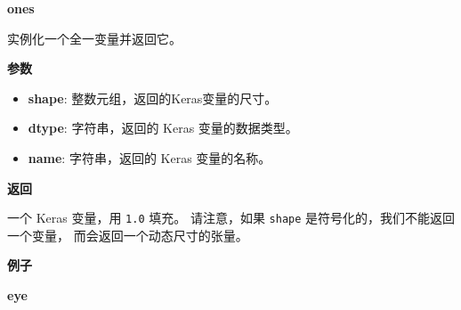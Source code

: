 \textbf{ones}\label{ones}

\begin{Shaded}
\begin{Highlighting}[]
\OperatorTok{=}\OperatorTok{=}\NormalTok{)}
\end{Highlighting}
\end{Shaded}

实例化一个全一变量并返回它。

\textbf{参数}

\begin{itemize}
\tightlist
\item
  \textbf{shape}: 整数元组，返回的Keras变量的尺寸。
\item
  \textbf{dtype}: 字符串，返回的 Keras 变量的数据类型。
\item
  \textbf{name}: 字符串，返回的 Keras 变量的名称。
\end{itemize}

\textbf{返回}

一个 Keras 变量，用 \texttt{1.0} 填充。 请注意，如果 \texttt{shape}
是符号化的，我们不能返回一个变量， 而会返回一个动态尺寸的张量。

\textbf{例子}

\begin{Shaded}
\begin{Highlighting}[]
\OperatorTok{>>>}    
\OperatorTok{>>>} \OperatorTok{=} \NormalTok{,}\NormalTok{))}
\OperatorTok{>>>} 
\NormalTok{array([[ }\NormalTok{.],}
       \NormalTok{[ }\NormalTok{.],}
       \NormalTok{[ }\NormalTok{.]], dtype}\OperatorTok{=}
\end{Highlighting}
\end{Shaded}


\textbf{eye}\label{eye}

\begin{Shaded}
\begin{Highlighting}[]
\OperatorTok{=}\OperatorTok{=}\NormalTok{)}
\end{Highlighting}
\end{Shaded}

